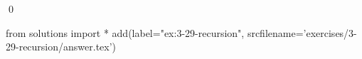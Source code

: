 
\begin{ex}
  \label{ex:3-29-recursion}
  
  \qed
\end{ex}
\begin{python0}
from solutions import *
add(label="ex:3-29-recursion",
    srcfilename='exercises/3-29-recursion/answer.tex')
\end{python0}
